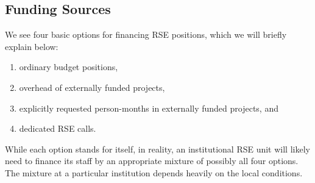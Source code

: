 \documentclass[a4paper]{article}
\begin{document}
\subsection{Funding Sources}%
\label{sec:funding}

We see four basic options for financing RSE positions, which we will briefly explain below:
\begin{enumerate}
\item ordinary budget positions,
\item overhead of externally funded projects,
\item explicitly requested person-months in externally funded projects, and
\item dedicated RSE calls.
\end{enumerate}
While each option stands for itself, in reality, an institutional RSE unit will likely need to finance its staff by an appropriate mixture of possibly all four options.
The mixture at a particular institution depends heavily on the local conditions.
\end{document}
